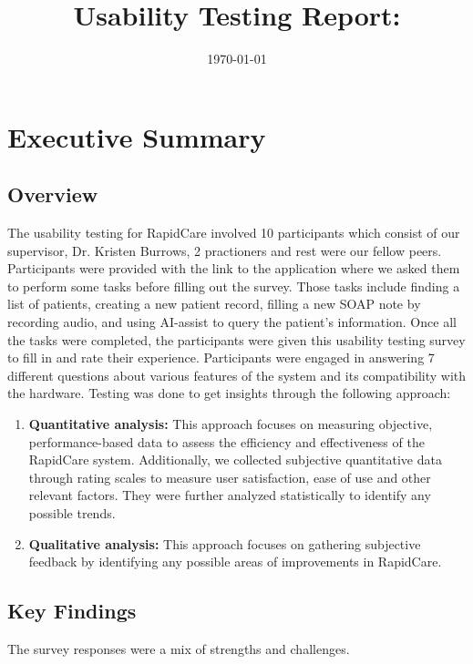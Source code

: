\documentclass{article}
\title{Usability Testing Report: \progname}
\author{\authname}
\date{\today}
\begin{document}
\newpage

\tableofcontents
\newpage

\section{Executive Summary}

\subsection{Overview}

The usability testing for RapidCare involved 10 participants which consist of our supervisor, Dr. Kristen Burrows, 2 practioners and rest were our fellow peers. Participants were provided with the link to the application where we asked them to perform some tasks before filling out the survey. Those tasks include finding a list of patients, creating a new patient record, filling a new SOAP note by recording audio, and using AI-assist to query the patient's information. Once all the tasks were completed, the participants were given this usability testing survey to fill in and rate their experience. Participants were engaged in answering 7 different questions about various features of the system and its compatibility with the hardware. Testing was done to get insights through the following approach:

\begin{enumerate}
    \item \textbf{Quantitative analysis:} This approach focuses on measuring objective, performance-based data to assess the efficiency and effectiveness of the RapidCare system. Additionally, we collected subjective quantitative data through rating scales to measure user satisfaction, ease of use and other relevant factors. They were further analyzed statistically to identify any possible trends.
    \item \textbf{Qualitative analysis:} This approach focuses on gathering subjective feedback by identifying any possible areas of improvements in RapidCare. 
\end{enumerate}

\subsection{Key Findings}

The survey responses were a mix of strengths and challenges.
\end{document}
